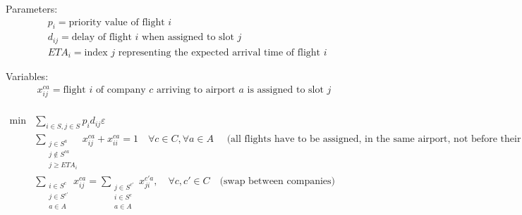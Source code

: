\documentclass{article}
\begin{document}
Parameters:
\begin{equation}
\begin{split}
    & p_i = \textrm{priority value of flight $i$}   \\
    & d_{i j} = \textrm{delay of flight $i$ when assigned to slot $j$ }\\
    & ETA_i = \textrm{index $j$ representing the expected arrival time of flight $i$}
\end{split}
   
\end{equation}

Variables:
\begin{equation}
\begin{split}
  & x_{i j}^{c a } = \textrm{flight $i$ of company $c$ arriving to airport $a$ is assigned to slot $j$ }   \\
\end{split}
   
\end{equation}


\begin{equation}
    \begin{split}
        \min &\sum _{i\in S , j \in S} p_i d_{i j} \varepsilon \\
        & \sum_{\substack{j \in S^a \\ j \not\in S^{c a} \\  j\geq ETA_i}} x_{i j}^{c a} + x_{i i}^{c a}=1 \quad \forall c \in C , \forall a \in A \quad \textrm{ (all flights have to be assigned, in the same airport, not before their ETA )} \\
        & \sum_{\substack{i \in S^c \\ j \in S^{c'} \\ a \in A }} x_{i j}^{c a} 
        = \sum_{\substack{j\in S^{c'} \\ i \in S^c \\  a \in A }} x_{j i}^{c' a} ,
        \quad \forall c,c' \in C \quad \textrm{(swap between companies)} 
    \end{split}
\end{equation}
\end{document}
